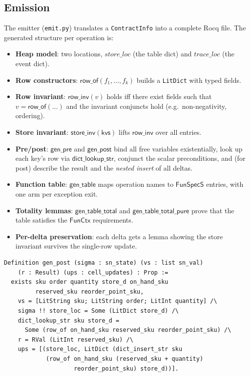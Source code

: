 \documentclass[11pt,a4paper]{article}
\begin{document}
\subsection{Emission}

The emitter (\texttt{emit.py}) translates a \texttt{ContractInfo} into
a complete Rocq file.  The generated structure per operation is:

\begin{itemize}[nosep]
\item \textbf{Heap model}: two locations,
  $\mathit{store\_loc}$ (the table dict) and $\mathit{trace\_loc}$
  (the event dict).
\item \textbf{Row constructors}: $\mathsf{row\_of}(f_1, \dots, f_k)$
  builds a \texttt{LitDict} with typed fields.
\item \textbf{Row invariant}: $\mathsf{row\_inv}(v)$ holds iff there
  exist fields such that $v = \mathsf{row\_of}(\dots)$ and the
  invariant conjuncts hold (e.g.\ non-negativity, ordering).
\item \textbf{Store invariant}: $\mathsf{store\_inv(kvs)}$ lifts
  $\mathsf{row\_inv}$ over all entries.
\item \textbf{Pre/post}: $\mathsf{gen\_pre}$ and $\mathsf{gen\_post}$
  bind all free variables existentially, look up each key's row via
  $\mathsf{dict\_lookup\_str}$, conjunct the scalar preconditions, and
  (for post) describe the result and the \emph{nested insert} of all
  deltas.
\item \textbf{Function table}: $\mathsf{gen\_table}$ maps operation
  names to $\mathsf{FunSpecS}$ entries, with one arm per exception
  exit.
\item \textbf{Totality lemmas}: $\mathsf{gen\_table\_total}$ and
  $\mathsf{gen\_table\_total\_pure}$ prove that the table satisfies
  the $\mathsf{FunCtx}$ requirements.
\item \textbf{Per-delta preservation}: each delta gets a lemma showing
  the store invariant survives the single-row update.
\end{itemize}

\begin{lstlisting}[style=coq]
Definition gen_post (sigma : sn_state) (vs : list sn_val)
    (r : Result) (ups : cell_updates) : Prop :=
  exists sku order quantity store_d on_hand_sku
         reserved_sku reorder_point_sku,
    vs = [LitString sku; LitString order; LitInt quantity] /\
    sigma !! store_loc = Some (LitDict store_d) /\
    dict_lookup_str sku store_d =
      Some (row_of on_hand_sku reserved_sku reorder_point_sku) /\
    r = RVal (LitInt reserved_sku) /\
    ups = [(store_loc, LitDict (dict_insert_str sku
            (row_of on_hand_sku (reserved_sku + quantity)
                    reorder_point_sku) store_d))].
\end{lstlisting}
\end{document}
